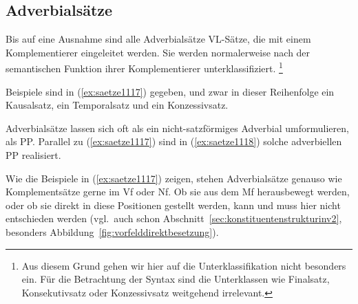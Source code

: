 \subsection{Adverbialsätze}

\label{sec:adverbialsaetze}

Bis auf eine Ausnahme sind alle Adverbialsätze VL-Sätze, die mit einem Komplementierer eingeleitet werden.
Sie werden normalerweise nach der semantischen Funktion ihrer Komplementierer unterklassifiziert.%
\footnote{Aus diesem Grund gehen wir hier auf die Unterklassifikation nicht besonders ein.
Für die Betrachtung der Syntax sind die Unterklassen wie Finalsatz, Konsekutivsatz oder Konzessivsatz weitgehend irrelevant.}


Beispiele sind in (\ref{ex:saetze1117}) gegeben, und zwar in dieser Reihenfolge ein Kausalsatz, ein Temporalsatz und ein Konzessivsatz.

\begin{exe}
  \ex\label{ex:saetze1117}
  \begin{xlist}
  \end{xlist}
\end{exe}

Adverbialsätze lassen sich oft als ein nicht-satzförmiges Adverbial umformulieren, \zB als PP.
Parallel zu (\ref{ex:saetze1117}) sind in (\ref{ex:saetze1118}) solche adverbiellen PP realisiert.

\begin{exe}
  \ex\label{ex:saetze1118}
  \begin{xlist}
  \end{xlist}
\end{exe}


Wie die Beispiele in (\ref{ex:saetze1117}) zeigen, stehen Adverbialsätze genauso wie Komplementsätze gerne im Vf oder Nf.
Ob sie aus dem Mf herausbewegt werden, oder ob sie direkt in diese Positionen gestellt werden, kann und muss hier nicht entschieden werden (vgl.\ auch schon Abschnitt~\ref{sec:konstituentenstrukturinv2}, besonders Abbildung~\ref{fig:vorfelddirektbesetzung}).

